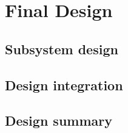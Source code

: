 \section{Final Design}\label{cha:finaldesign}

\subsection{Subsystem design}


\subsection{Design integration}  \label{sec:designintegration}


\subsection{Design summary} \label{sec:designsummary}

